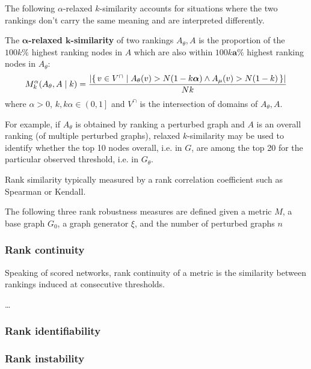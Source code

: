 The following $\alpha$-relaxed $k$-similarity accounts for situations where the two rankings don't carry the same meaning and are interpreted differently.

\begin{definition}
    The \textbf{$\bm{\alpha}$-relaxed $\bm{k}$-similarity} of two rankings $A_\theta, A$ is the proportion of the $100k\%$ highest ranking nodes in $A$ which are also within $100k\bm{a}\%$ highest ranking nodes in $A_\theta$:
    \[ M_k^\alpha(A_\theta, A \mid k) = \frac{\left\lvert \left\{\, v \in V^{\cap} \mid  A_\theta(v) > N(1-k\bm{\alpha}) \wedge A_\mu(v) > N(1-k)  \, \right\} \right\rvert}{Nk} \]
    where $\alpha > 0$, $k, k\alpha \in \left( 0, 1 \right]$ and $V^{\cap}$ is the intersection of domains of $A_\theta, A$.
\end{definition}

For example, if $A_\theta$ is obtained by ranking a perturbed graph and $A$ is an overall ranking (of multiple perturbed graphs), relaxed $k$-similarity may be used to identify whether the top 10 nodes overall, i.e. in $G$, are among the top 20 for the particular observed threshold, i.e. in $G_\theta$.


 Rank similarity typically measured by a rank correlation coefficient such as Spearman or Kendall.

\parspace

The following three rank robustness measures are defined given a metric $M$, a base graph $G_0$, a graph generator $\xi$, and the number of perturbed graphs $n$

\subsubsection{Rank continuity}\label{sub:rank_continuity}

Speaking of scored networks, rank continuity of a metric is the similarity between rankings induced at consecutive thresholds.

\ldots

\subsubsection{Rank identifiability}

\subsubsection{Rank instability}

